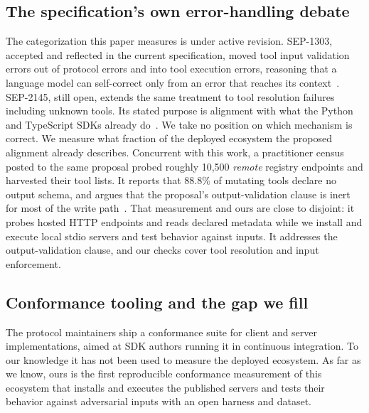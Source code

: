 \subsection{The specification's own error-handling debate}
The categorization this paper measures is under active revision. SEP-1303, accepted
and reflected in the current specification, moved tool input validation errors out of
protocol errors and into tool execution errors, reasoning that a language model can
self-correct only from an error that reaches its context~\cite{sep1303}. SEP-2145,
still open, extends the same treatment to tool resolution failures
including unknown tools. Its stated purpose is alignment with what the Python and
TypeScript SDKs already do~\cite{sep2145}. We take no position on which mechanism is
correct. We measure what fraction of the deployed ecosystem the proposed alignment
already describes. Concurrent with this work, a practitioner census posted to the same
proposal probed roughly 10,500 \emph{remote} registry endpoints and harvested their
tool lists. It reports that \(88.8\%\) of mutating tools declare no output schema, and
argues that the proposal's output-validation clause is inert for most of the write
path~\cite{siliroid2026census}. That measurement and ours are close to disjoint: it probes hosted HTTP endpoints and
reads declared metadata while we install and execute local stdio servers and test
behavior against inputs. It addresses the output-validation clause, and our checks
cover tool resolution and input enforcement.

\subsection{Conformance tooling and the gap we fill}
The protocol maintainers ship a conformance suite for client and server
implementations, aimed at SDK authors running it in continuous integration. To our
knowledge it has not been used to measure the deployed ecosystem. As far as we know,
ours is the first reproducible conformance measurement of this ecosystem
that installs and executes the published servers and tests their behavior against
adversarial inputs with an open harness and dataset.
